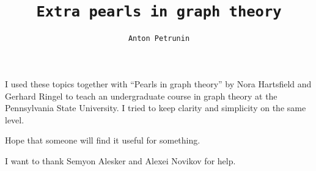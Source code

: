 \title{\tt Extra pearls in graph theory}
\author{\tt Anton Petrunin}
\date{}
\maketitle

I used these topics together with ``Pearls in graph theory'' by Nora Hartsfield and Gerhard Ringel \cite{pearls} to teach an undergraduate course in graph theory at the Pennsylvania State University.
I tried to keep clarity and simplicity on the same level.

Hope that someone will find it useful for something.

\medskip

I want to thank Semyon Alesker and Alexei Novikov for help.

\null\vfill{}


\thispagestyle{empty}
\newpage
\tableofcontents
